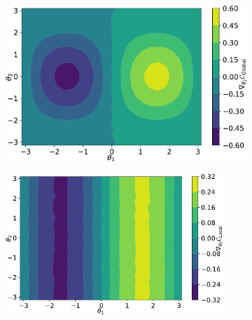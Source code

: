 \begin{figure}[t]
\begin{subfigure}[b]{0.48\linewidth}
\begin{minipage}{0.9\textwidth}
    \end{minipage}
    \end{subfigure}\\
    \begin{subfigure}[b]{0.48\linewidth}
    \begin{minipage}
    {.03\textwidth}
        \caption{}
        \label{fig:barren-plateau-3}
    \end{minipage}%
    \begin{minipage}{0.90\textwidth}
        \includegraphics[width=.9\linewidth]{figures/qleet/Global_cost_grad_landscape.pdf}
    \end{minipage}
    \end{subfigure}
    \begin{subfigure}[b]{0.48\textwidth}
    \begin{minipage}{.08\textwidth}
        \caption{}
        \label{fig:barren-plateau-4}
    \end{minipage}%
    \begin{minipage}{0.9\textwidth}
        \includegraphics[width=0.9\textwidth]{figures/qleet/Local_cost_grad_landscape.pdf}

\end{minipage}
\end{subfigure}
\end{figure}
